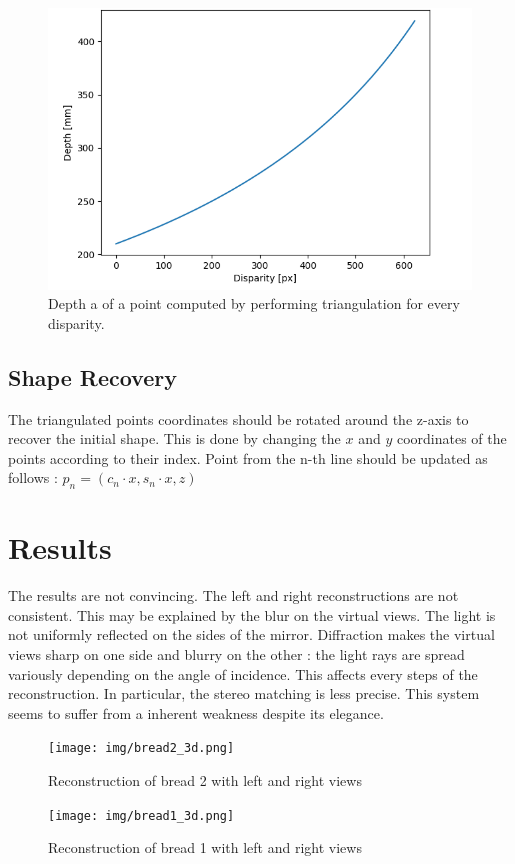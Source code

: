 \documentclass[a4paper,twocolumn,fleqn]{article}
\begin{document}
\begin{figure}[t]
  \includegraphics[width=1\columnwidth]{img/depth_disp.png}
  \caption{Depth a of a point computed by performing triangulation for every disparity.}
\end{figure}

\subsection{Shape Recovery}
The triangulated points coordinates should be rotated around the z-axis to recover the initial shape. This is done by changing the $x$ and $y$ coordinates of the points according to their index. Point from the n-th line should be updated as follows : $p_{n} = (c_{n} \cdot x, s_{n} \cdot x, z)$

\section{Results}
The results are not convincing. The left and right reconstructions are not consistent. This may be explained by the blur on the virtual views. The light is not uniformly reflected on the sides of the mirror. Diffraction makes the virtual views sharp on one side and blurry on the other : the light rays are spread variously depending on the angle of incidence. This affects every steps of the reconstruction. In particular, the stereo matching is less precise. This system seems to suffer from a inherent weakness despite its elegance.

\begin{figure}[!ht]
  \centering
  \texttt{[image: img/bread2\_3d.png]}
  \caption{Reconstruction of bread 2 with left and right views}
  \texttt{[image: img/bread1\_3d.png]}
  \caption{Reconstruction of bread 1 with left and right views}
\end{figure}
\end{document}
